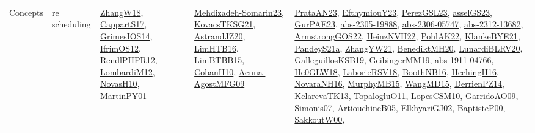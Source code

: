 {\begin{longtable}{llp{6cm}p{6cm}p{6cm}}
Concepts & re scheduling & \href{articles/ZhangW18.pdf}{ZhangW18}\cite{ZhangW18}, \href{papers/CappartS17.pdf}{CappartS17}\cite{CappartS17}, \href{articles/GrimesIOS14.pdf}{GrimesIOS14}\cite{GrimesIOS14}, \href{papers/IfrimOS12.pdf}{IfrimOS12}\cite{IfrimOS12}, \href{papers/RendlPHPR12.pdf}{RendlPHPR12}\cite{RendlPHPR12}, \href{articles/LombardiM12.pdf}{LombardiM12}\cite{LombardiM12}, \href{articles/NovasH10.pdf}{NovasH10}\cite{NovasH10}, \href{articles/MartinPY01.pdf}{MartinPY01}\cite{MartinPY01} & \href{papers/Mehdizadeh-Somarin23.pdf}{Mehdizadeh-Somarin23}\cite{Mehdizadeh-Somarin23}, \href{papers/KovacsTKSG21.pdf}{KovacsTKSG21}\cite{KovacsTKSG21}, \href{articles/AstrandJZ20.pdf}{AstrandJZ20}\cite{AstrandJZ20}, \href{papers/LimHTB16.pdf}{LimHTB16}\cite{LimHTB16}, \href{papers/LimBTBB15.pdf}{LimBTBB15}\cite{LimBTBB15}, \href{papers/CobanH10.pdf}{CobanH10}\cite{CobanH10}, \href{papers/Acuna-AgostMFG09.pdf}{Acuna-AgostMFG09}\cite{Acuna-AgostMFG09} & \href{articles/PrataAN23.pdf}{PrataAN23}\cite{PrataAN23}, \href{papers/EfthymiouY23.pdf}{EfthymiouY23}\cite{EfthymiouY23}, \href{papers/PerezGSL23.pdf}{PerezGSL23}\cite{PerezGSL23}, \href{papers/asselGS23.pdf}{asselGS23}\cite{asselGS23}, \href{articles/GurPAE23.pdf}{GurPAE23}\cite{GurPAE23}, \href{articles/abs-2305-19888.pdf}{abs-2305-19888}\cite{abs-2305-19888}, \href{articles/abs-2306-05747.pdf}{abs-2306-05747}\cite{abs-2306-05747}, \href{articles/abs-2312-13682.pdf}{abs-2312-13682}\cite{abs-2312-13682}, \href{papers/ArmstrongGOS22.pdf}{ArmstrongGOS22}\cite{ArmstrongGOS22}, \href{articles/HeinzNVH22.pdf}{HeinzNVH22}\cite{HeinzNVH22}, \href{articles/PohlAK22.pdf}{PohlAK22}\cite{PohlAK22}, \href{papers/KlankeBYE21.pdf}{KlankeBYE21}\cite{KlankeBYE21}, \href{articles/PandeyS21a.pdf}{PandeyS21a}\cite{PandeyS21a}, \href{articles/ZhangYW21.pdf}{ZhangYW21}\cite{ZhangYW21}, \href{articles/BenediktMH20.pdf}{BenediktMH20}\cite{BenediktMH20}, \href{articles/LunardiBLRV20.pdf}{LunardiBLRV20}\cite{LunardiBLRV20}, \href{papers/GalleguillosKSB19.pdf}{GalleguillosKSB19}\cite{GalleguillosKSB19}, \href{papers/GeibingerMM19.pdf}{GeibingerMM19}\cite{GeibingerMM19}, \href{articles/abs-1911-04766.pdf}{abs-1911-04766}\cite{abs-1911-04766}, \href{papers/He0GLW18.pdf}{He0GLW18}\cite{He0GLW18}, \href{articles/LaborieRSV18.pdf}{LaborieRSV18}\cite{LaborieRSV18}, \href{papers/BoothNB16.pdf}{BoothNB16}\cite{BoothNB16}, \href{papers/HechingH16.pdf}{HechingH16}\cite{HechingH16}, \href{articles/NovaraNH16.pdf}{NovaraNH16}\cite{NovaraNH16}, \href{papers/MurphyMB15.pdf}{MurphyMB15}\cite{MurphyMB15}, \href{articles/WangMD15.pdf}{WangMD15}\cite{WangMD15}, \href{papers/DerrienPZ14.pdf}{DerrienPZ14}\cite{DerrienPZ14}, \href{papers/KelarevaTK13.pdf}{KelarevaTK13}\cite{KelarevaTK13}, \href{articles/TopalogluO11.pdf}{TopalogluO11}\cite{TopalogluO11}, \href{articles/LopesCSM10.pdf}{LopesCSM10}\cite{LopesCSM10}, \href{articles/GarridoAO09.pdf}{GarridoAO09}\cite{GarridoAO09}, \href{articles/Simonis07.pdf}{Simonis07}\cite{Simonis07}, \href{papers/ArtiouchineB05.pdf}{ArtiouchineB05}\cite{ArtiouchineB05}, \href{papers/ElkhyariGJ02.pdf}{ElkhyariGJ02}\cite{ElkhyariGJ02}, \href{articles/BaptisteP00.pdf}{BaptisteP00}\cite{BaptisteP00}, \href{articles/SakkoutW00.pdf}{SakkoutW00}\cite{SakkoutW00}, 
\end{longtable}}
